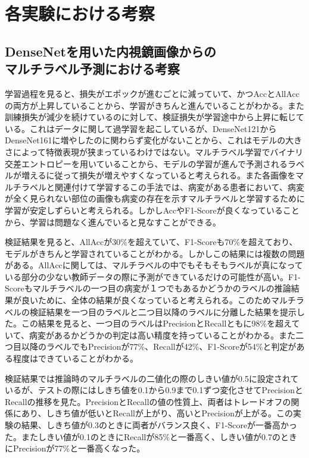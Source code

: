 \section{各実験における考察}
\subsection{DenseNetを用いた内視鏡画像からの\\マルチラベル予測における考察}
学習過程を見ると、損失がエポックが進むごとに減っていて、かつAccとAllAccの両方が上昇していることから、学習がきちんと進んでいることがわかる。また訓練損失が減少を続けているのに対して、検証損失が学習途中から上昇に転じている。これはデータに関して過学習を起こしているが、DenseNet121からDenseNet161に増やしたのに関わらず変化がないことから、これはモデルの大きさによって特徴表現が狭まっているわけではない。マルチラベル学習でバイナリ交差エントロピーを用いていることから、モデルの学習が進んで予測されるラベルが増えるに従って損失が増えやすくなっていると考えられる。また各画像をマルチラベルと関連付けて学習するこの手法では、病変がある患者において、病変が全く見られない部位の画像も病変の存在を示すマルチラベルと学習するために学習が安定しずらいと考えられる。しかしAccやF1-Scoreが良くなっていることから、学習は問題なく進んでいると見なすことができる。

検証結果を見ると、AllAccが30\%を超えていて、F1-Scoreも70\%を超えており、モデルがきちんと学習されていることがわかる。しかしこの結果には複数の問題がある。AllAccに関しては、マルチラベルの中でもそもそもラベルが真になっている部分の少ない教師データの際に予測ができているだけの可能性が高い。F1-Scoreもマルチラベルの一つ目の病変が１つでもあるかどうかのラベルの推論結果が良いために、全体の結果が良くなっていると考えられる。このためマルチラベルの検証結果を一つ目のラベルと二つ目以降のラベルに分離した結果を提示した。この結果を見ると、一つ目のラベルはPrecisionとRecallともに98\%を超えていて、病変があるかどうかの判定は高い精度を持っていることがわかる。また二つ目以降のラベルでもPrecisionが77\%、Recallが42\%、F1-Scoreが54\%と判定がある程度はできていることがわかる。

検証結果では推論時のマルチラベルの二値化の際のしきい値が0.5に設定されているが、テストの際にはしきち値を0.1から0.9まで0.1ずつ変化させてPrecisionとRecallの推移を見た。PrecisionとRecallの値の性質上、両者はトレードオフの関係にあり、しきち値が低いとRecallが上がり、高いとPrecisionが上がる。この実験の結果、しきち値が0.3のときに両者がバランス良く、F1-Scoreが一番高かった。またしきい値が0.1のときにRecallが85\%と一番高く、しきい値が0.7のときにPrecisionが77\%と一番高くなった。

